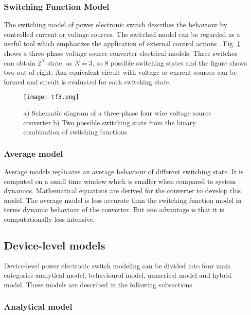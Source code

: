 \documentclass[journal]{IEEEtran}
\begin{document}
\subsubsection{Switching Function Model}
The switching model of power electronic switch describes the behaviour by controlled current or voltage sources. The switched model can be regarded as a useful tool which emphasizes the application of external control actions \cite{bacha2014power}. Fig. \ref{fig:T3} shows a three-phase voltage source converter electrical models. Three switches can obtain $2^{N}$ state, as $N=3$, so $8$ possible switching states and the figure shows two out of eight. Asn equivalent circuit with voltage or current sources can be formed and circuit is evaluated for each switching state.   

\begin{figure}[ht]
    \centering
    \texttt{[image: tf3.png]}
    \caption{a) Schematic diagram of a three-phase four wire voltage source converter \cite{bacha2014power} b) Two possible switching state from the binary combination of switching functions  }
    \label{fig:T3}
\end{figure}

\subsubsection{Average model}
Average models replicates an average behaviour of different switching state. It is computed on a small time window which is smaller when compared to system dynamics. Mathematical equations are derived for the converter to develop this model. The average model is less accurate than the switching function model in terms dynamic behaviour of the converter. But one advantage is that it is computationally less intensive.


\subsection{Device-level models}

Device-level power electronic switch modeling can be divided into four main categories analytical model, behavioural model, numerical model and hybrid model. These models are described in the following subsections.


\subsubsection{Analytical model}
\end{document}
